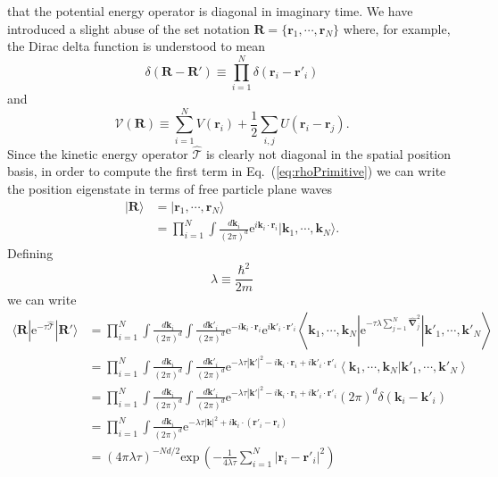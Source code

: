 \documentclass[prb,aps,amssym,nofootinbib,floatfix,notitlepage]{revtex4-1}
\renewcommand{\vec}[1]{\boldsymbol{#1}}
\newcommand{\e}[1]{\mathrm{e}^{#1}}
\renewcommand{\eqref}[1]{Eq.~(\ref{#1})}
\newcommand{\R}{\vec{R}}
\newcommand{\T}{\mathcal{T}}
\begin{document}
that the potential energy operator is diagonal in imaginary time. We have
introduced a slight abuse of the set notation
$\R = \{\vec{r}_1, \cdots, \vec{r}_N \}$ where, for example, the Dirac delta
function is understood to mean
%
\begin{equation}
    \delta(\R-\R') \equiv \prod_{i=1}^{N}\delta(\vec{r}_i-\vec{r}'_i)
\end{equation}
%
and 
%
\begin{equation}
    \mathcal{V}(\R) \equiv \sum_{i=1}^N V(\vec{r}_i) + \frac{1}{2}\sum_{i,j}
U(\vec{r}_i-\vec{r}_j).
\end{equation}
%
Since the kinetic energy operator $\hat{\T}$ is clearly not diagonal in the
spatial position basis, in order to compute the first term in
\eqref{eq:rhoPrimitive} we can write the position eigenstate in terms of free
particle plane waves
%
\begin{align}
    |\R \rangle &=  | \vec{r}_1, \cdots, \vec{r}_N \rangle \nonumber \\
                &= \prod_{i=1}^N \int \frac{d\vec{k}_i}{(2\pi)^d} 
    \e{i \vec{k}_i \cdot \vec{r}_i} | \vec{k}_1, \cdots, \vec{k}_N\rangle.
\end{align}
%
Defining
%
\begin{equation}
    \lambda \equiv \frac{\hbar^2}{2 m}
\end{equation}
%
we can write
%
\begin{align}
    \langle \R | \e{-\tau\hat{\T}}|\R'\rangle &= \prod_{i=1}^N 
    \int \frac{d\vec{k}_i}{(2\pi)^d} \int \frac{d\vec{k}'_i}{(2\pi)^d} 
    \e{-i \vec{k}_i \cdot \vec{r}_i} \e{i \vec{k}'_i \cdot \vec{r}'_i} 
    \left \langle \vec{k}_1, \cdots, \vec{k}_N \left | \e{-\tau \lambda
\sum_{j=1}^N\hat{\vec{\nabla}}_j^2} \right | \vec{k}'_1, \cdots, \vec{k}'_N
\right \rangle \nonumber \\
&= \prod_{i=1}^N\int \frac{d\vec{k}_i}{(2\pi)^d} \int \frac{d\vec{k}'_i}{(2\pi)^d} 
\e{-\lambda \tau |\vec{k}'|^2 - i \vec{k}_i \cdot \vec{r}_i + i \vec{k}'_i \cdot
\vec{r}'_i} \left \langle \vec{k}_1, \cdots, \vec{k}_N | \vec{k}'_1, \cdots,
\vec{k}'_N \right \rangle \nonumber \\
&= \prod_{i=1}^N\int \frac{d\vec{k}_i}{(2\pi)^d} \int \frac{d\vec{k}'_i}{(2\pi)^d} 
\e{-\lambda \tau |\vec{k}'|^2 - i \vec{k}_i \cdot \vec{r}_i + i \vec{k}'_i \cdot
\vec{r}'_i}  (2\pi)^d \delta(\vec{k}_i-\vec{k}'_i) \nonumber \\
&= \prod_{i=1}^N\int \frac{d\vec{k}_i}{(2\pi)^d} 
\e{-\lambda \tau |\vec{k}|^2 + i \vec{k}_i \cdot (\vec{r}'_i - \vec{r}_i)}  
\nonumber \\
&= (4\pi \lambda \tau)^{-Nd/2} \mathrm{exp}\,\left( -\frac{1}{4\lambda
\tau} \sum_{i=1}^N | \vec{r}_i-\vec{r}'_i|^2 \right) 
\end{align}
\end{document}
